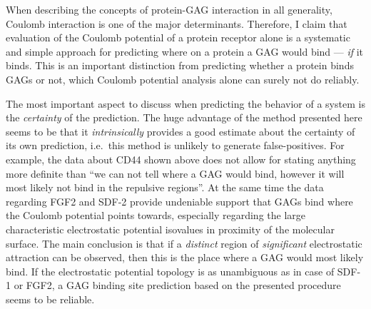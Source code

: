 When describing the concepts of protein-GAG interaction in all generality,
Coulomb interaction is one of the major determinants. Therefore, I claim that
evaluation of the Coulomb potential of a protein receptor alone is a systematic
and simple approach for predicting where on a protein a GAG would bind ---
\textit{if} it binds. This is an important distinction from predicting whether a
protein binds GAGs or not, which Coulomb potential analysis alone can surely not
do reliably.

The most important aspect to discuss when predicting the behavior of a system is
the \textit{certainty} of the prediction. The huge advantage of the method
presented here seems to be that it \textit{intrinsically} provides a good
estimate about the certainty of its own prediction, i.e.\ this method is
unlikely to generate false-positives. For example, the data about CD44 shown
above does not allow for stating anything more definite than \enquote{we can not
tell where a GAG would bind, however it will most likely not bind in the
repulsive regions}. At the same time the data regarding FGF2 and SDF-2 provide
undeniable support that GAGs bind where the Coulomb potential points towards,
especially regarding the large characteristic electrostatic potential isovalues
in proximity of the molecular surface. The main conclusion is that if a
\textit{distinct} region of \textit{significant} electrostatic attraction can be
observed, then this is the place where a GAG would most likely bind. If the
electrostatic potential topology is as unambiguous as in case of SDF-1 or FGF2,
a GAG binding site prediction based on the presented procedure seems to be
reliable.

